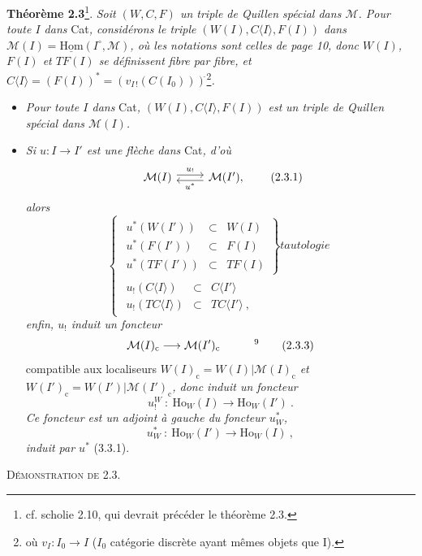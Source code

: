\documentclass[11pt]{article}
\newcommand{\printedpage}[1]{\marginpar{\footnotesize p.~#1}}
\newcommand{\msp}[1]{\marginpar{\footnotesize [#1]}}
\newcommand{\M}{\mathcal{M}}
\newcommand{\Ho}{\mathrm{Ho}}
\newcommand{\cc}{\mathrm{c}}
\begin{document}
\textbf{Théorème 2.3}\footnote[7]{cf. scholie 2.10, qui devrait précéder le théorème 2.3.}. \textit{Soit $(W,C,F)$ un triple de Quillen spécial dans $\M$. Pour toute $I$ dans} Cat\textit{, considérons le triple $(W(I),C\langle I\rangle,F(I))$ dans $\M(I) = \underline{\mathrm{Hom}}(I^{\circ},\M)$, où les notations sont celles de page 10, donc $W(I)$, $F(I)$ et $TF(I)$ se définissent fibre par fibre, et $C\langle I\rangle = (F(I))^* = (v_{I\,!}(C(I_0)))^{\breve{}}$}\footnote[8]{où $v_I : I_0 \longrightarrow I$ ($I_0$ catégorie discrète ayant mêmes objets que I).}\textit{.}
\begin{itemize}
\item[1°)] \textit{Pour toute $I$ dans} Cat\textit{, $(W(I),C\langle I\rangle,F(I))$ est}
\msp{page 20}
\textit{un triple de Quillen spécial dans $\M(I)$.}
\item[2°)] \textit{Si $u : I \longrightarrow I'$ est une flèche dans} Cat\textit{, d'où}
\[
\begin{tikzcd}
\M(I) \arrow[r, shift left, "u_!"] & \M(I'), \arrow[l, shift left, "u^*"]
\end{tikzcd}
\tag*{(2.3.1)}
\]
\textit{alors}
\[
\left\{
\begin{array}{l}
\left.\begin{array}{rcl}
u^*(W(I')) & \subset & W(I)\\
u^*(F(I')) & \subset & F(I)\\
u^*(TF(I')) & \subset & TF(I)
\end{array}\right\}\textit{tautologie}\\
\begin{array}{rcl}
u_!(C\langle I\rangle) & \subset & C\langle I'\rangle\\
u_!(TC\langle I\rangle) & \subset & TC\langle I'\rangle\ ,
\end{array}
\end{array}\right.
\tag*{(2.3.2)}
\]
\textit{enfin, $u_!$ induit un foncteur}
\[
\M(I)_{\cc} \longrightarrow \M(I')_{\cc} \qquad\quad \text{\footnotemark[9]}
\tag*{(2.3.3)}
\]
compatible aux localiseurs $W(I)_{\cc} = W(I)|\M(I)_{\cc}$ \textit{et} $W(I')_{\cc} = W(I')|\M(I')_{\cc}$\textit{, donc induit un foncteur}
\[
u_!^W\ :\ \Ho_W(I) \longrightarrow \Ho_W(I')\ .
\tag*{(2.3.4)}
\]
\printedpage{13}
\textit{Ce foncteur est un adjoint à gauche du foncteur $u^*_W$,}
\[
u^*_W\ :\ \Ho_W(I') \longrightarrow \Ho_W(I)\ ,
\tag*{(2.3.5)}
\]
\textit{induit par $u^*$} (3.3.1). %
\end{itemize}
\textsc{Démonstration de 2.3.}
\end{document}
